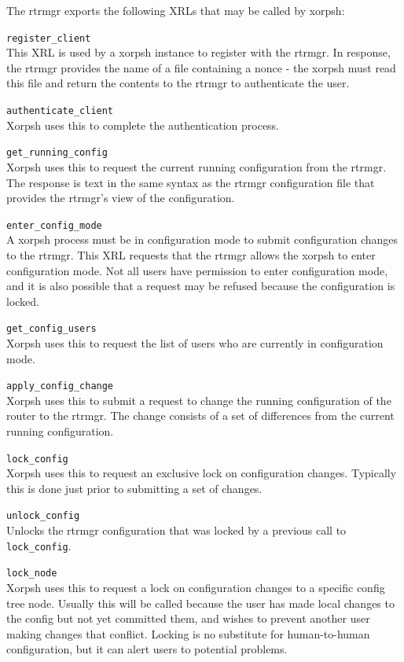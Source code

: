 \documentclass[11pt]{article}
\begin{document}
The rtrmgr exports the following XRLs that may be called by xorpsh:
\begin{description}
\item{\tt register\_client} \\This XRL is used by a xorpsh instance to
register with the rtrmgr.  In response, the rtrmgr provides the name
of a file containing a nonce - the xorpsh must read this file and
return the contents to the rtrmgr to authenticate the user.
\item{\tt authenticate\_client} \\Xorpsh uses this to complete the
authentication process.
\item{\tt get\_running\_config} \\Xorpsh uses this to request the
current running configuration from the rtrmgr.  The response is text
in the same syntax as the rtrmgr configuration file that provides the
rtrmgr's view of the configuration.
\item{\tt enter\_config\_mode} \\A xorpsh process must be in
configuration mode to submit configuration changes to the rtrmgr.
This XRL requests that the rtrmgr allows the xorpsh to enter
configuration mode.  Not all users have permission to enter
configuration mode, and it is also possible that a request may be
refused because the configuration is locked.  
\item{\tt get\_config\_users} \\Xorpsh uses this to request the list of
users who are currently in configuration mode. 
\item{\tt apply\_config\_change} \\Xorpsh uses this to submit a request
to change the running configuration of the router to the rtrmgr.  The
change consists of a set of differences from the current running
configuration.
\item{\tt lock\_config} \\Xorpsh uses this to request an exclusive
lock on configuration changes.  Typically this is done just prior to
submitting a set of changes.
\item{\tt unlock\_config} \\Unlocks the rtrmgr configuration that was
locked by a previous call to {\tt lock\_config}.
\item{\tt lock\_node} \\Xorpsh uses this to request a lock on
configuration changes to a specific config tree node.  Usually this
will be called because the user has made local changes to the config
but not yet committed them, and wishes to prevent another user making
changes that conflict.  Locking is no substitute for human-to-human
configuration, but it can alert users to potential problems.


\end{description}
\end{document}
